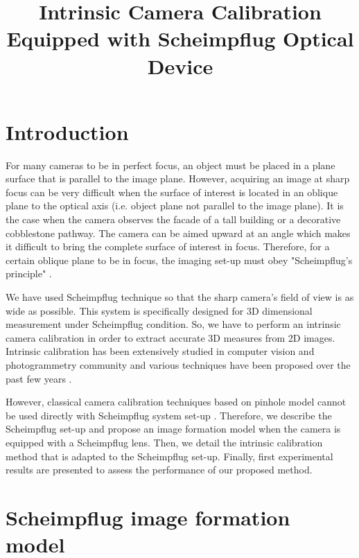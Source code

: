 \documentclass[12pt]{article}
\title{Intrinsic Camera Calibration Equipped with Scheimpflug Optical Device}
\author
{Peter Fasogbon$^{1,2}$, Luc Duvieubourg$^{1}$, Pierre-Antoine Lacaze$^{2}$, Ludovic Macaire$^{1}$\\
\\
\normalsize{$^{1}$Laboratoire Lagis, Universit\'{e} of Lille1, UMR CNRS 8219}\\
\normalsize{Cit\'{e} Scientifique - Bat P2 - 59655 Villeneuve d'Ascq Cedex}\\
\normalsize{$^{2}$SNCF Direction de l'Ingi\'{e}nerie, ---, Plaine Saint Senis, FRANCE}\\
\\
\normalsize{$^\ast$ E-mail:  faspetpeak@yahoo.com}
}
\date{}
\begin{document}
 


\baselineskip24pt


\maketitle 




\section*{Introduction}


For many cameras to be in perfect focus, an object must be placed in a plane surface that is parallel to the image plane. However, acquiring an image at sharp focus can be very difficult when the surface of interest is located in an oblique plane to the optical axis (i.e. object plane not parallel to the image plane). It is the case when the camera observes the facade of a tall building or a decorative cobblestone pathway. The camera can be aimed upward at an angle which makes it difficult to bring the complete surface of interest in focus.  Therefore, for a certain oblique plane to be in focus, the imaging set-up must obey "Scheimpflug's principle" \cite{Astarita:2012}. 

We have used Scheimpflug technique so that the sharp camera's field of view is as wide as possible. This system is specifically designed for 3D dimensional measurement under Scheimpflug condition. So, we have to perform an intrinsic camera calibration in order to extract accurate 3D measures from 2D images. Intrinsic calibration has been extensively studied  in computer vision and photogrammetry community and various techniques have been proposed over the past few years \cite{Salvi:2000}.

However, classical camera calibration techniques based on pinhole model cannot be used directly with Scheimpflug system set-up \cite{Prasad95}. Therefore, we describe the Scheimpflug set-up and propose an image formation model when the camera is equipped with a Scheimpflug lens. Then, we detail the intrinsic calibration method that is adapted to the Scheimpflug set-up. Finally, first experimental results are presented to assess the performance of our proposed method. 


\section{Scheimpflug image formation model}
\end{document}
